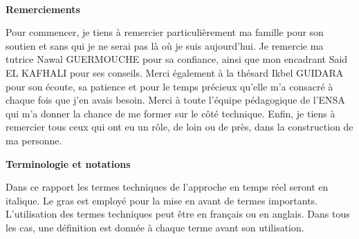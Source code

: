 \documentclass[a4paper,11pt,oneside]{report}
\begin{document}
\makeatother

\newpage

\ \newline

\newpage

\begin{flushleft}

\textbf{Remerciements}

Pour commencer, je tiens à remercier particulièrement ma famille pour son soutien et sans qui je ne serai pas là où je suis aujourd’hui. Je remercie ma tutrice Nawal GUERMOUCHE pour sa confiance, ainsi que mon encadrant Said EL KAFHALI pour ses conseils. Merci également à la thésard Ikbel GUIDARA  pour son écoute, sa patience et pour le temps précieux qu'elle m’a consacré à chaque fois que j’en avais besoin. Merci à toute l'équipe pédagogique de l'ENSA qui m'a donner la chance de me former sur le côté technique. Enfin, je tiens à remercier tous ceux qui ont eu un rôle, de loin ou de près, dans la construction de ma personne.

\textbf{Terminologie et notations}

Dans ce rapport les termes techniques de l’approche en temps réel seront en italique. Le gras est employé pour la mise en avant de termes importants. L’utilisation des termes techniques peut être en français ou en anglais. Dans tous les cas, une définition est donnée à chaque terme avant son utilisation.

\end{flushleft}





\end{document}
